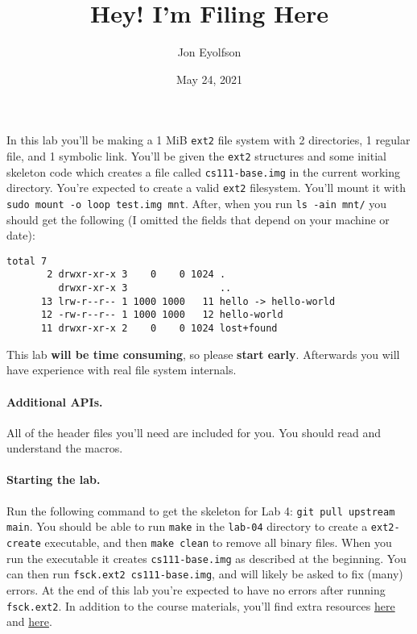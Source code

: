 

\title{Hey! I'm Filing Here}
\author{Jon Eyolfson}
\date{May 24, 2021}



\maketitle

In this lab you'll be making a 1 MiB \texttt{ext2} file system with 2
directories, 1 regular file, and 1 symbolic link.
You'll be given the \texttt{ext2} structures and some initial skeleton code
which creates a file called \texttt{cs111-base.img} in the current working
directory.
You're expected to create a valid \texttt{ext2} filesystem.
You'll mount it with \texttt{sudo mount -o loop test.img mnt}.
After, when you run \texttt{ls -ain mnt/} you should get the following
(I omitted the fields that depend on your machine or date):

\begin{lstlisting}
total 7
       2 drwxr-xr-x 3    0    0 1024 .
         drwxr-xr-x 3                ..
      13 lrw-r--r-- 1 1000 1000   11 hello -> hello-world
      12 -rw-r--r-- 1 1000 1000   12 hello-world
      11 drwxr-xr-x 2    0    0 1024 lost+found
\end{lstlisting}

This lab \textbf{will be time consuming}, so please \textbf{start early}.
Afterwards you will have experience with real file system internals.

\paragraph{Additional APIs.}

All of the header files you'll need are included for you.
You should read and understand the macros.

\paragraph{Starting the lab.}

Run the following command to get the skeleton for Lab 4:
\texttt{git pull upstream main}.
You should be able to run \texttt{make} in the \texttt{lab-04} directory to
create a \texttt{ext2-create} executable, and then \texttt{make clean}
to remove all binary files.
When you run the executable it creates \texttt{cs111-base.img} as described
at the beginning.
You can then run \lstinline|fsck.ext2 cs111-base.img|, and will likely be
asked to fix (many) errors.
At the end of this lab you're expected to have no errors after running
\lstinline|fsck.ext2|.
In addition to the course materials, you'll find extra resources
\href{http://www.nongnu.org/ext2-doc/ext2.html}{here} and
\href{http://www.science.smith.edu/~nhowe/262/oldlabs/ext2.html}{here}.

